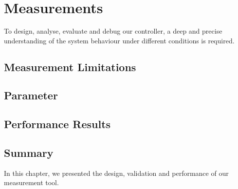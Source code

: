\chapter{Measurements}
\label{sec:mmeasurement}

To design, analyse, evaluate and debug  our controller,  a deep and precise understanding of the system behaviour under different conditions is required.
%




\section{Measurement Limitations}
\label{sec:measurement:current}
%


\section{Parameter}
\label{sec:measurement:parameter}
%



%



\section{Performance Results}
\label{sec:results}
%



\section{Summary}

In this chapter, we presented the design, validation and performance of our measurement tool.
%